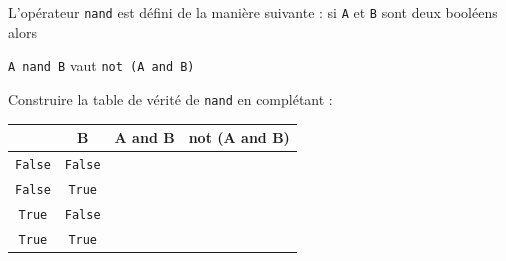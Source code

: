 \begin{exercice}
	L'opérateur \texttt{nand} est défini de la manière suivante : si \texttt{A} et \texttt{B} sont deux booléens alors
	\begin{center}
		\texttt{A nand B} vaut \texttt{not (A and B)}
	\end{center}
	Construire la table de vérité de \texttt{nand} en complétant :
	\begin{center}
		\tabularstyled
		\begin{tabular}{|c|c|c|c|}
			\hline
			\rowcolor{UGLiOrange}{\boxfont\color{white} A} & {\boxfont\color{white} B} & {\boxfont\color{white} A and B} & {\boxfont\color{white} not (A and B)} \\
			\hline
			\texttt{False}                           & \texttt{False}      &                                 &                                       \\
			\hline
			\texttt{False}                           & \texttt{True}       &                                 &                                       \\
			\hline
			\texttt{True}                            & \texttt{False}      &                                 &                                       \\
			\hline
			\texttt{True}                            & \texttt{True}       &                                 &                                       \\
			\hline
		\end{tabular}
	\end{center}
\end{exercice}


